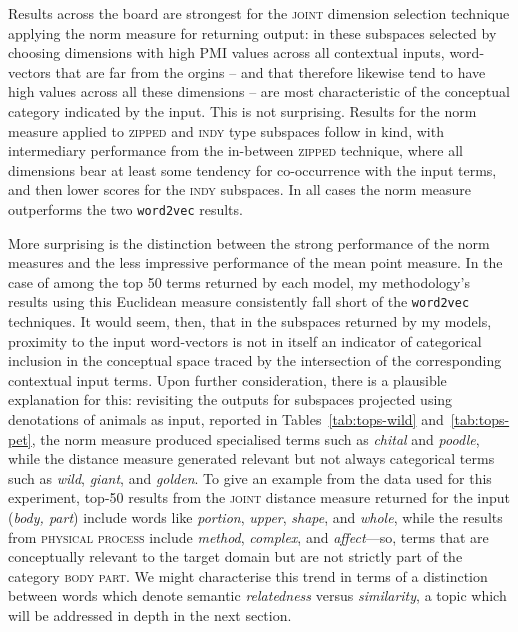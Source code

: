Results across the board are strongest for the \textsc{joint} dimension selection technique applying the norm measure for returning output: in these subspaces selected by choosing dimensions with high PMI values across all contextual inputs, word-vectors that are far from the orgins -- and that therefore likewise tend to have high values across all these dimensions -- are most characteristic of the conceptual category indicated by the input.  This is not surprising.  Results for the norm measure applied to \textsc{zipped} and \textsc{indy} type subspaces follow in kind, with intermediary performance from the in-between \textsc{zipped} technique, where all dimensions bear at least some tendency for co-occurrence with the input terms, and then lower scores for the \textsc{indy} subspaces.  In all cases the norm measure outperforms the two \texttt{word2vec} results.

More surprising is the distinction between the strong performance of the norm measures and the less impressive performance of the mean point measure.  In the case of   among the top 50 terms returned by each model, my methodology's results using this Euclidean measure consistently fall short of the \texttt{word2vec} techniques.  It would seem, then, that in the subspaces returned by my models, proximity to the input word-vectors is not in itself an indicator of categorical inclusion in the conceptual space traced by the intersection of the corresponding contextual input terms.  Upon further consideration, there is a plausible explanation for this: revisiting the outputs for subspaces projected using denotations of animals as input, reported in Tables~\ref{tab:tops-wild} and~\ref{tab:tops-pet}, the norm measure produced specialised terms such as \emph{chital} and \emph{poodle}, while the distance measure generated relevant but not always categorical terms such as \emph{wild}, \emph{giant}, and \emph{golden}.  To give an example from the data used for this experiment, top-50 results from the \textsc{joint} distance measure returned for the input (\emph{body, part}) include words like \emph{portion}, \emph{upper}, \emph{shape}, and \emph{whole}, while the results from \textsc{physical process} include \emph{method}, \emph{complex}, and \emph{affect}---so, terms that are conceptually relevant to the target domain but are not strictly part of the category \textsc{body part}.  We might characterise this trend in terms of a distinction between words which denote semantic \emph{relatedness} versus \emph{similarity}, a topic which will be addressed in depth in the next section.

